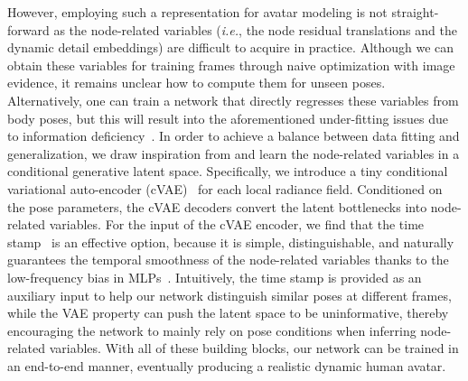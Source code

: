 However, employing such a representation for avatar modeling is not straight-forward as the node-related variables (\textit{i.e.}, the node residual translations and the dynamic detail embeddings) are difficult to acquire in practice. 
Although we can obtain these variables for training frames through naive optimization with image evidence, it remains unclear how to compute them for unseen poses. 
Alternatively, one can train a network that directly regresses these variables from body poses, but this will result into the aforementioned under-fitting issues due to information deficiency~\cite{timur2021driving_signal}. 
In order to achieve a balance between data fitting and generalization, we draw inspiration from \cite{timur2021driving_signal} and learn the node-related variables in a conditional generative latent space. Specifically, we introduce a tiny conditional variational auto-encoder (cVAE)~\cite{Sohn2015cvae} for each local radiance field. 
Conditioned on the pose parameters, the cVAE decoders convert the latent bottlenecks into node-related variables. For the input of the cVAE encoder, we find that the time stamp~\cite{Pumarola20arxiv_D_NeRF,Xian20arxiv_stnif,Gao-freeviewvideo} is an effective option, because it is simple, distinguishable, and naturally guarantees the temporal smoothness of the node-related variables thanks to the low-frequency bias in MLPs~\cite{tancik2020fourfeat}. 
Intuitively, the time stamp is provided as an auxiliary input to help our network distinguish similar poses at different frames, while the VAE property can push the latent space to be uninformative, thereby encouraging the network to mainly rely on pose conditions when inferring node-related variables. 
With all of these building blocks, our network can be trained in an end-to-end manner, eventually producing a realistic dynamic human avatar. 



